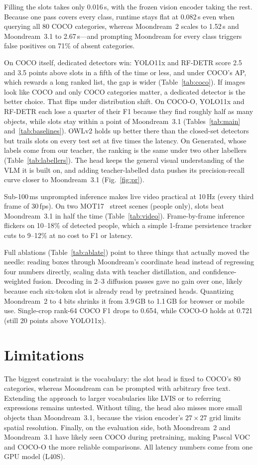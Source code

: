 \documentclass[10pt,twocolumn]{article}
\begin{document}
Filling the slots takes only 0.016\,s, with the frozen vision encoder taking the rest.
Because one pass covers every class, runtime stays flat at 0.082\,s even when querying
all 80 COCO categories, whereas Moondream~2 scales to 1.52\,s and Moondream~3.1 to
2.67\,s—and prompting Moondream for every class triggers false positives on 71\% of
absent categories.

On COCO itself, dedicated detectors win: YOLO11x and RF-DETR score 2.5 and 3.5 points
above slots in a fifth of the time or less, and under COCO's AP, which rewards a long
ranked list, the gap is wider (Table~\ref{tab:coco}). If images look like COCO and only
COCO categories matter, a dedicated detector is the better choice. That flips under
distribution shift. On COCO-O, YOLO11x and RF-DETR each lose a quarter of their F1 because
they find roughly half as many objects, while slots stay within a point of Moondream~3.1
(Tables~\ref{tab:main} and~\ref{tab:baselines}). OWLv2 holds up better there than the closed-set detectors but
trails slots on every test set at five times the latency. On Generated, whose labels come
from our teacher, the ranking is the same under two other labellers
(Table~\ref{tab:labellers}). The head keeps the general visual understanding of the VLM it is
built on, and adding teacher-labelled data pushes its precision-recall curve closer to
Moondream~3.1 (Fig.~\ref{fig:pr}).

Sub-100\,ms unprompted inference makes live video practical at 10\,Hz (every third frame
of 30\,fps). On two MOT17~\citep{milan2016mot16} street scenes (people only), slots beat
Moondream~3.1 in half the time (Table~\ref{tab:video}). Frame-by-frame inference flickers on 10--18\% of detected people, which a simple 1-frame
persistence tracker cuts to 9--12\% at no cost to F1 or latency.

Full ablations (Table~\ref{tab:ablate}) point to three things that actually moved the
needle: reading boxes through Moondream's coordinate head instead of regressing four
numbers directly, scaling data with teacher distillation, and confidence-weighted fusion.
Decoding in 2--3 diffusion passes gave no gain over one, likely because each six-token
slot is already read by pretrained heads. Quantizing Moondream~2 to 4 bits shrinks it
from 3.9\,GB to 1.1\,GB for browser or mobile use. Single-crop rank-64 COCO F1 drops to
0.654, while COCO-O holds at 0.721 (still 20 points above YOLO11x).

\section{Limitations}
The biggest constraint is the vocabulary: the slot head is fixed to COCO's 80 categories,
whereas Moondream can be prompted with arbitrary free text. Extending the approach to larger vocabularies like LVIS or to referring expressions
remains untested. Without tiling, the head also misses
more small objects than Moondream~3.1, because the vision encoder's $27\times27$ grid
limits spatial resolution. Finally, on the evaluation side, both Moondream~2 and
Moondream~3.1 have likely seen COCO during pretraining, making Pascal VOC and COCO-O the
more reliable comparisons. All latency numbers come from one GPU model (L40S).
\end{document}
